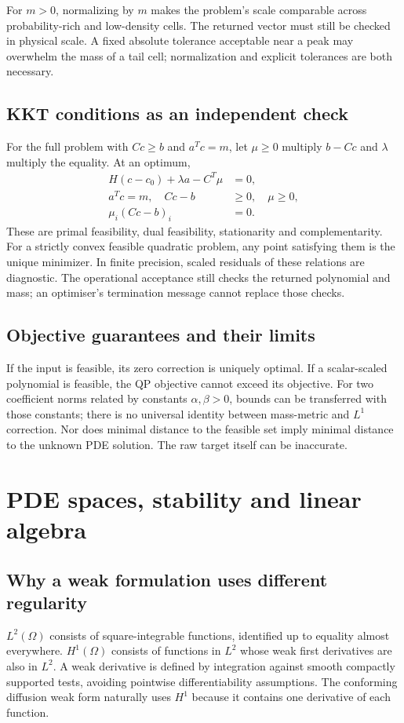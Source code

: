 For $m>0$, normalizing by $m$ makes the problem's scale comparable across probability-rich and low-density cells. The returned vector must still be checked in physical scale. A fixed absolute tolerance acceptable near a peak may overwhelm the mass of a tail cell; normalization and explicit tolerances are both necessary.

\section{KKT conditions as an independent check}
For the full problem with $Cc\ge b$ and $a^Tc=m$, let $\mu\ge0$ multiply $b-Cc$ and $\lambda$ multiply the equality. At an optimum,
\begin{align}
 H(c-c_0)+\lambda a-C^T\mu&=0,\\
 a^Tc=m,\quad Cc-b&\ge0,\quad\mu\ge0,\\
 \mu_i(Cc-b)_i&=0.
\end{align}
These are primal feasibility, dual feasibility, stationarity and complementarity. For a strictly convex feasible quadratic problem, any point satisfying them is the unique minimizer. In finite precision, scaled residuals of these relations are diagnostic. The operational acceptance still checks the returned polynomial and mass; an optimiser's termination message cannot replace those checks.

\section{Objective guarantees and their limits}
If the input is feasible, its zero correction is uniquely optimal. If a scalar-scaled polynomial is feasible, the QP objective cannot exceed its objective. For two coefficient norms related by constants $\alpha,\beta>0$, bounds can be transferred with those constants; there is no universal identity between mass-metric and $L^1$ correction. Nor does minimal distance to the feasible set imply minimal distance to the unknown PDE solution. The raw target itself can be inaccurate.

\chapter{PDE spaces, stability and linear algebra}
\section{Why a weak formulation uses different regularity}
$L^2(\Omega)$ consists of square-integrable functions, identified up to equality almost everywhere. $H^1(\Omega)$ consists of functions in $L^2$ whose weak first derivatives are also in $L^2$. A weak derivative is defined by integration against smooth compactly supported tests, avoiding pointwise differentiability assumptions. The conforming diffusion weak form naturally uses $H^1$ because it contains one derivative of each function.


